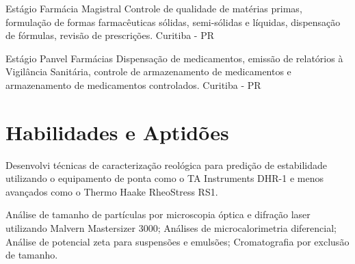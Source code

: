 {Estágio}
{Farmácia Magistral}
{
	Controle de qualidade de matérias primas, 
	formulação de formas farmacêuticas sólidas, 
	semi-sólidas e líquidas, dispensação de fórmulas, 
	revisão de prescrições.
}
{Curitiba - PR}

{Estágio}
{Panvel Farmácias}
{
	Dispensação de medicamentos, 
	emissão de relatórios à Vigilância Sanitária, 
	controle de armazenamento de medicamentos e 
	armazenamento de medicamentos controlados.
}
{Curitiba - PR}

\section{Habilidades e Aptidões}






	
	{
	Desenvolvi técnicas de caracterização reológica para 
	predição de estabilidade utilizando o 
	equipamento de ponta como o TA Instruments DHR-1 e 
	menos avançados como o Thermo Haake RheoStress RS1.
	}

\renewcommand{\labelitemi}{\textendash}

{
Análise de tamanho de partículas por microscopia óptica e difração laser utilizando Malvern Mastersizer 3000;
Análises de microcalorimetria diferencial;
Análise de potencial zeta para suspensões e emulsões;
Cromatografia por exclusão de tamanho.
}

